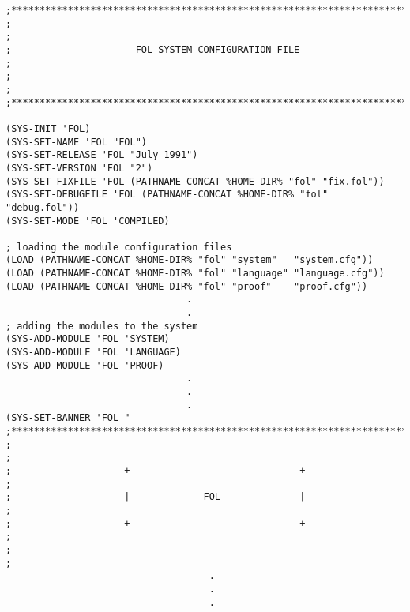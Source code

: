 \begin{boxverbatim}
\begin{verbatim}
;************************************************************************;
;                                                                        ;
;                      FOL SYSTEM CONFIGURATION FILE                     ;
;                                                                        ;
;************************************************************************;

(SYS-INIT 'FOL)
(SYS-SET-NAME 'FOL "FOL")
(SYS-SET-RELEASE 'FOL "July 1991")
(SYS-SET-VERSION 'FOL "2")
(SYS-SET-FIXFILE 'FOL (PATHNAME-CONCAT %HOME-DIR% "fol" "fix.fol"))
(SYS-SET-DEBUGFILE 'FOL (PATHNAME-CONCAT %HOME-DIR% "fol" "debug.fol"))
(SYS-SET-MODE 'FOL 'COMPILED)

; loading the module configuration files
(LOAD (PATHNAME-CONCAT %HOME-DIR% "fol" "system"   "system.cfg"))
(LOAD (PATHNAME-CONCAT %HOME-DIR% "fol" "language" "language.cfg"))
(LOAD (PATHNAME-CONCAT %HOME-DIR% "fol" "proof"    "proof.cfg"))
                                .
                                .
; adding the modules to the system
(SYS-ADD-MODULE 'FOL 'SYSTEM)
(SYS-ADD-MODULE 'FOL 'LANGUAGE)
(SYS-ADD-MODULE 'FOL 'PROOF)
                                .
                                .
                                .
(SYS-SET-BANNER 'FOL "
;*************************************************************************;
;                                                                         ;
;                    +------------------------------+                     ;
;                    |             FOL              |                     ;
;                    +------------------------------+                     ;
;                                                                         ;
                                    .
                                    .
                                    .
\end{verbatim}
\end{boxverbatim}
